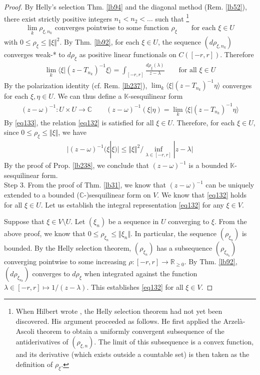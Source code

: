 \documentclass[12pt,b5paper,notitlepage]{article}
\theoremstyle{definition}
\theoremstyle{plain}
\newcommand{\bk}[1]{\langle {#1}\rangle}
\newcommand{\Kbb}{\mathbb K}
\newcommand{\Cbb}{\mathbb C}
\newcommand{\Rbb}{\mathbb R}
\numberwithin{equation}{section}
\begin{document}
\begin{proof}
By Helly's selection Thm. \ref{lb94} and the diagonal method (Rem. \ref{lb52}), there exist strictly positive integers $n_1<n_2<\dots$ such that \footnote{When Hilbert wrote \cite{Hil06}, the Helly selection theorem had not yet been discovered. His argument proceeded as follows. He first applied the Arzel\`a-Ascoli theorem to obtain a uniformly convergent subsequence of the antiderivatives of $(\rho_{\xi,n})$. The limit of this subsequence is a convex function, and its derivative (which exists outside a countable set) is then taken as the definition of $\rho_\xi$.}
\begin{align*}
\lim_k \rho_{\xi,n_k}\text{ converges pointwise to some function }\rho_\xi\qquad\text{for each }\xi\in U
\end{align*}
with $0\leq\rho_\xi\leq\Vert\xi\Vert^2$. By Thm. \ref{lb92}, for each $\xi\in U$, the sequence $(d\rho_{\xi,n_k})$ converges weak-* to $d\rho_\xi$ as positive linear functionals on $C([-r,r])$. Therefore
\begin{align}\label{eq133}
\lim_k\bk{\xi|(z-T_{n_k})^{-1}\xi}=\int_{[-r,r]}\frac{d\rho_\xi(\lambda)}{z-\lambda}\qquad\text{for all }\xi\in U
\end{align}
By the polarization identity (cf. Rem. \ref{lb237}), $\lim_k\bk{\xi|(z-T_{n_k})^{-1}\eta}$ converges for each $\xi,\eta\in U$. We can thus define a $\Kbb$-sesquilinear form
\begin{align}\label{eq135}
(z-\omega)^{-1}:U\times U\rightarrow\Cbb\qquad (z-\omega)^{-1}(\xi|\eta)=\lim_k\bk{\xi|(z-T_{n_k})^{-1}\eta}
\end{align}
By \eqref{eq133}, the relation \eqref{eq132} is satisfied for all $\xi\in U$. Therefore, for each $\xi\in U$, since $0\leq\rho_\xi\leq\Vert\xi\Vert$, we have
\begin{align}\label{eq136}
\big| (z-\omega)^{-1}(\xi|\xi)\big|\leq \Vert\xi\Vert^2/\inf_{\lambda\in[-r,r]}|z-\lambda|
\end{align}
By the proof of Prop. \ref{lb238}, we conclude that $(z-\omega)^{-1}$ is a bounded $\Kbb$-sesquilinear form.\\[-1ex]


Step 3. From the proof of Thm. \ref{lb31}, we know that $(z-\omega)^{-1}$ can be uniquely extended to a bounded ($\Cbb$-)sesquilinear form on $V$. We know that \eqref{eq132} holds for all $\xi\in U$. Let us establish the integral representation \eqref{eq132} for any $\xi\in V$.

Suppose that $\xi\in V\setminus U$. Let $(\xi_n)$ be a sequence in $U$ converging to $\xi$. From the above proof, we know that $0\leq\rho_{\xi_n}\leq\Vert\xi_n\Vert$. In particular, the sequence $(\rho_{\xi_n})$ is bounded. By the Helly selection theorem,  $(\rho_{\xi_n})$ has a subsequence $(\rho_{\xi_{n_k}})$ converging pointwise to some increasing $\rho:[-r,r]\rightarrow\Rbb_{\geq0}$. By Thm. \ref{lb92}, $(d\rho_{\xi_{n_k}})$ converges to $d\rho_\xi$ when integrated against the function $\lambda\in[-r,r]\mapsto 1/(z-\lambda)$. This establishes \eqref{eq132} for all $\xi\in V$.
\end{proof}
\end{document}
